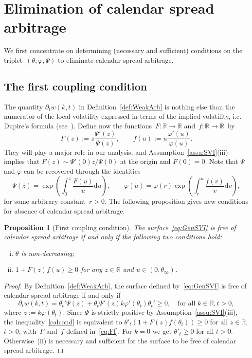 \documentclass{amsart}[11pt]
\numberwithin{equation}{section}
\newtheorem{proposition}[theorem]{Proposition}
\theoremstyle{definition}
\newcommand{\D}{\mathrm{d}}
\newcommand{\RR}{\mathbb{R}}
\begin{document}
\section{Elimination of calendar spread arbitrage} \label{sec_cal}
We first concentrate on determining (necessary and sufficient) conditions on the triplet~$(\theta, \varphi, \Psi)$
to eliminate calendar spread arbitrage.



\subsection{The first coupling condition}
The quantity $\partial_t w(k,t)$ in Definition~\ref{def:WeakArb} is nothing else than the numerator of the local volatility expressed 
in terms of the implied volatility, i.e. Dupire's formula (see~\cite{jimbook}).
Define now the functions~$F:\RR\to\RR$ and~$f:\RR\to\RR$~by
\begin{equation}\label{eq:Ff}
F(z):=z\frac{\Psi'(z)}{\Psi(z)},\qquad
f(u):=u\frac{\varphi'(u)}{\varphi(u)}.
\end{equation}
They will play a major role in our analysis, and 
Assumption~\ref{assu:SVI}(iii) implies that $F(z) \sim \Psi'(0) z/\Psi(0)$ at the origin and $F(0)=0$.
Note that $\Psi$ and $\varphi$ can be recovered through the identities
$$
\Psi(z)=\exp\left({\int_0^z \frac{F(u)}{u}}\D u\right),
\qquad
\varphi(u)=\varphi(r)\exp\left({\int_{r}^{u}\frac{f(v)}{v}}\D v\right),
$$
for some arbitrary constant~$r>0$.
The following proposition gives new conditions for absence of calendar spread arbitrage.
\begin{proposition}[First coupling condition] \label{prop:first_coupling}
The surface~\eqref{eq:GenSVI} is free of calendar spread arbitrage if and only if the following two conditions hold:
\begin{enumerate}[(i)]
\item $\theta$ is non-decreasing;
\item $1+F(z)f(u)\geq 0$ for any $z\in\RR$ and $u\in(0, \theta_\infty)$.
\end{enumerate}
\end{proposition}
\begin{proof}
By Definition~\ref{def:WeakArb}, the surface defined by~\eqref{eq:GenSVI} is free of calendar spread arbitrage if and only if
\begin{equation} \label{calcond}
\partial_tw(k,t)=\theta_t'\Psi(z)+\theta_t\Psi'(z)k\varphi'(\theta_t)\theta_t'\geq 0,
\quad\text{for all }k\in\mathbb{R}, t>0,
\end{equation}
where $z:=k\varphi(\theta_t)$. 
Since $\Psi$ is strictly positive by Assumption~\ref{assu:SVI}(iii), the inequality~\eqref{calcond} is equivalent to
$\theta'_t\left(1+F(z)f(\theta_t)\right)\geq 0$ for all  $z\in\mathbb{R}$, $t>0$, 
with~$F$ and~$f$ defined in~\eqref{eq:Ff}.
For $k=0$ we get $\theta'_t\geq0$ for all $t>0$. 
Otherwise~(ii) is necessary and sufficient for the surface to be free of calendar spread arbitrage.
\end{proof}
\end{document}
